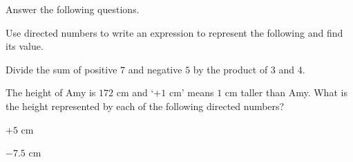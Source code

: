  Answer the following questions.

\begin{subparts}
  \item Use directed numbers to write an expression to represent the following and find its value.

  Divide the sum of positive $7$ and negative $5$ by the product of $3$ and $4$.

  \item The height of Amy is $172$ cm and `$+1$ cm' means $1$ cm taller than Amy. What is the height represented by each of the following directed numbers?
  \begin{subpartsii}
    \item $+5$ cm
    \item $-7.5$ cm
  \end{subpartsii}
\end{subparts}

